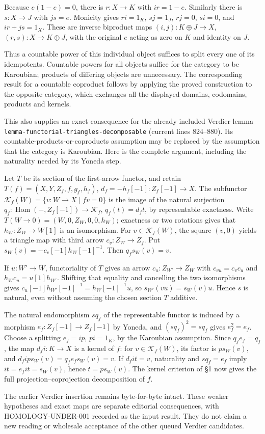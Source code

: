 Because \(e(1-e)=0\),\allowbreak{} there is \(r:X\to K\) with \(ir=1-e\). Similarly there is \(s:X\to J\) with \(js=e\). Monicity gives \(ri=1_K\),\allowbreak{} \(sj=1_J\),\allowbreak{} \(rj=0\),\allowbreak{} \(si=0\),\allowbreak{} and \(ir+js=1_X\). These are inverse biproduct maps \((i,j):K\oplus J\to X\),\allowbreak{} \((r,s):X\to K\oplus J\),\allowbreak{} with the original \(e\) acting as zero on \(K\) and identity on \(J\).

Thus a countable power of this individual object suffices to split every one of its idempotents. Countable powers for all objects suffice for the category to be Karoubian; products of differing objects are unnecessary. The corresponding result for a countable coproduct follows by applying the proved construction to the opposite category,\allowbreak{} which exchanges all the displayed domains,\allowbreak{} codomains,\allowbreak{} products and kernels.

This also supplies an exact consequence for the already included Verdier lemma \texttt{lemma-\allowbreak{}functorial-\allowbreak{}triangles-\allowbreak{}decomposable} (current lines 824–\allowbreak{}880)\allowbreak{}. Its countable-products-or-coproducts assumption may be replaced by the assumption that the category is Karoubian. Here is the complete argument,\allowbreak{} including the naturality needed by its Yoneda step.

Let \(T\) be its section of the first-arrow functor,\allowbreak{} and retain \(T(f)=(X,Y,Z_f,f,g_f,h_f)\),\allowbreak{} \(d_f=-h_f[-1]:Z_f[-1]\to X\). The subfunctor \(\mathcal K_f(W)=\{v:W\to X\mid fv=0\}\) is the image of the natural surjection \(q_f:\operatorname{Hom}(-,Z_f[-1])\to\mathcal K_f\),\allowbreak{} \(q_f(t)=d_ft\),\allowbreak{} by representable exactness. Write \(T(W\to0)=(W,0,Z_W,0,0,h_W)\); exactness or two rotations gives that \(h_W:Z_W\to W[1]\) is an isomorphism. For \(v\in\mathcal K_f(W)\),\allowbreak{} the square \((v,0)\) yields a triangle map with third arrow \(c_v:Z_W\to Z_f\). Put \(s_W(v)=-c_v[-1]h_W[-1]^{-1}\). Then \(q_fs_W(v)=v\).

If \(u:W'\to W\),\allowbreak{} functoriality of \(T\) gives an arrow \(c_u:Z_{W'}\to Z_W\) with \(c_{vu}=c_vc_u\) and \(h_Wc_u=u[1]h_{W'}\). Shifting that equality and cancelling the two isomorphisms gives \(c_u[-1]h_{W'}[-1]^{-1}=h_W[-1]^{-1}u\),\allowbreak{} so \(s_{W'}(vu)=s_W(v)u\). Hence \(s\) is natural,\allowbreak{} even without assuming the chosen section \(T\) additive.

The natural endomorphism \(sq_f\) of the representable functor is induced by a morphism \(e_f:Z_f[-1]\to Z_f[-1]\) by Yoneda,\allowbreak{} and \((sq_f)^2=sq_f\) gives \(e_f^2=e_f\). Choose a splitting \(e_f=ip\),\allowbreak{} \(pi=1_K\),\allowbreak{} by the Karoubian assumption. Since \(q_fe_f=q_f\),\allowbreak{} the map \(d_fi:K\to X\) is a kernel of \(f\):\allowbreak{} for \(v\in\mathcal K_f(W)\),\allowbreak{} its factor is \(p s_W(v)\),\allowbreak{} and \(d_fip s_W(v)=q_fe_fs_W(v)=v\). If \(d_fit=v\),\allowbreak{} naturality and \(sq_f=e_f\) imply \(it=e_f it=s_W(v)\),\allowbreak{} hence \(t=p s_W(v)\). The kernel criterion of §1 now gives the full projection–\allowbreak{}coprojection decomposition of \(f\).

The earlier Verdier insertion remains byte-for-byte intact. These weaker hypotheses and exact maps are separate editorial consequences,\allowbreak{} with HOMOLOGY-UNDER-001 recorded as the input result. They do not claim a new reading or wholesale acceptance of the other queued Verdier candidates.
